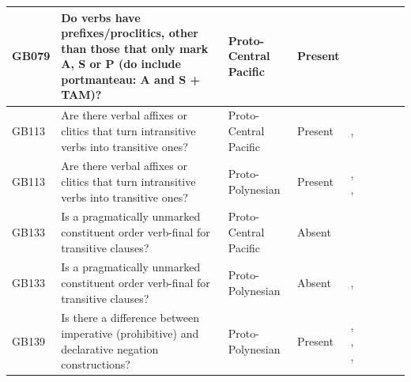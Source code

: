 \documentclass[draft,10pt]{article} %
\begin{document}
\begin{landscape}
\begin{longtable}{| p{2cm}| p{3cm}| p{2.5cm}|p{2cm}|p{2cm}|p{2cm}|p{2cm}|p{2cm}|p{2cm}|}
GB079&Do verbs have prefixes/proclitics, other than those that only mark A, S or P (do include portmanteau: A and S + TAM)?&Proto-Central Pacific&Present&\citet[352]{pawley1970change}& \cellcolor{hedvig_lightgreen!50}{True Positive} & \cellcolor{hedvig_lightgreen!50}{True Positive} & \cellcolor{hedvig_lightgreen!50}{True Positive} & \cellcolor{hedvig_lightgreen!50}{True Positive} \\ \hline
GB113&Are there verbal affixes or clitics that turn intransitive verbs into transitive ones?&Proto-Central Pacific&Present&\citet[352]{pawley1970change}, \citet[4]{marck2000_encyclo}& \cellcolor{hedvig_lightgreen!50}{True Positive} & \cellcolor{hedvig_lightgreen!50}{True Positive} & \cellcolor{hedvig_lightgreen!50}{True Positive} & \cellcolor{hedvig_lightgreen!50}{True Positive} \\ \hline
GB113&Are there verbal affixes or clitics that turn intransitive verbs into transitive ones?&Proto-Polynesian&Present&\citet[4]{marck2000_encyclo}, \citet[57]{jonsson1998}, \citet[352]{pawley1970change}& \cellcolor{hedvig_lightgreen!50}{True Positive} & \cellcolor{hedvig_lightgreen!50}{True Positive} & \cellcolor{hedvig_lightgreen!50}{True Positive} & \cellcolor{hedvig_lightgreen!50}{True Positive} \\ \hline
GB133&Is a pragmatically unmarked constituent order verb-final for transitive clauses?&Proto-Central Pacific&Absent&\citet[122]{kikusawa2002proto}& \cellcolor{hedvig_lightgreen!50}{True Negative} & \cellcolor{hedvig_yellow!50}{True Negative} & \cellcolor{hedvig_yellow!50}{True Negative} & \cellcolor{hedvig_yellow!50}{True Negative} \\ \hline
GB133&Is a pragmatically unmarked constituent order verb-final for transitive clauses?&Proto-Polynesian&Absent&\cite[15]{chung1978}, \citet[118]{pawley1973some}& \cellcolor{hedvig_lightgreen!50}{True Negative} & \cellcolor{hedvig_yellow!50}{True Negative} & \cellcolor{hedvig_yellow!50}{True Negative} & \cellcolor{hedvig_yellow!50}{True Negative} \\ \hline
GB139&Is there a difference between imperative (prohibitive) and declarative negation constructions?&Proto-Polynesian&Present&\citet[142]{pawley1973some}, \citet[292]{ross2007two}, \citet[xiii, 125]{clark1976aspects}, \citet[89]{lynchrosscrowley_proto_grammar_oceanic}& \cellcolor{hedvig_lightgreen!50}{True Positive} & \cellcolor{hedvig_lightgreen!50}{True Positive} & \cellcolor{hedvig_lightgreen!50}{True Positive} & \cellcolor{hedvig_lightgreen!50}{True Positive} \\ \hline

\end{longtable}
\end{landscape}
\end{document}
